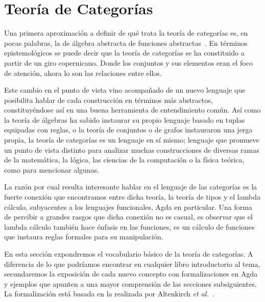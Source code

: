 \chapter{Teor\'ia de Categor\'ias} \label{cat}

\begin{epigraphs}
\end{epigraphs}

Una primera aproximación a definir de qué trata la teoría de categorías es, en pocas palabras, la de álgebra abstracta de funciones abstractas~\cite{Awodey}. 
En términos epistemológicos se puede decir que la teoría de categorías se ha constituido a partir de un giro copernicano. Donde los conjuntos y sus elementos eran el foco de atención, ahora lo son las relaciones entre ellos.

Este cambio en el punto de vista vino acompañado de un nuevo lenguaje que posibilita hablar de cada construcción en términos más abstractos, constituyéndose así en una buena herramienta de entendimiento común. 
Así como la teoría de álgebras ha sabido instaurar su propio lenguaje basado en tuplas equipadas con reglas, o la teoría de conjuntos o de grafos instauraron una jerga propia, la teoría de categorías es un lenguaje en sí mismo; lenguaje que promueve un punto de vista distinto para analizar muchas construcciones de diversas ramas de la matemática, la lógica, las ciencias de la computación o la física teórica, como para mencionar algunas.  


La razón por cual resulta interesante hablar en el lenguaje de las categorías es la fuerte conexión que encontramos entre dicha teoría, la teoría de tipos y el lambda cálculo, subyacentes a los lenguajes funcionales, Agda en particular. Una forma de percibir a grandes rasgos que dicha conexión no es casual, es observar que el lambda cálculo también hace énfasis en las funciones, es un cálculo de funciones que instaura reglas formales para su manipulación. 

En esta sección expondremos el vocabulario básico de la teoría de categorías. A diferencia de lo que podríamos encontrar en cualquier libro introductorio al tema, secundaremos la exposición de cada nuevo concepto con formalizaciones en Agda y ejemplos que apunten a una mayor comprensión de las secciones subsiguientes. La formalización está basada en la realizada por Altenkirch {\it et al.}~\cite{relativemonads}.  
\newpage

